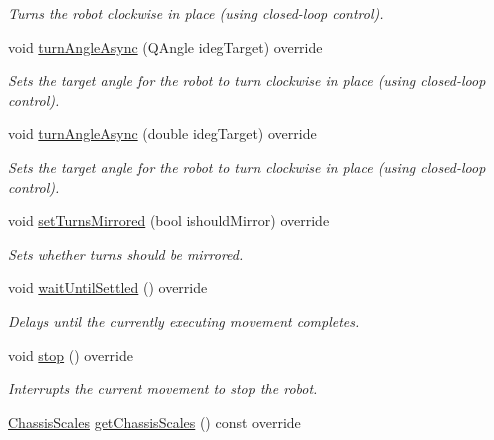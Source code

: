 \begin{DoxyCompactItemize}
\begin{DoxyCompactList}\small\item\em Turns the robot clockwise in place (using closed-\/loop control). \end{DoxyCompactList}\item 
void \mbox{\hyperlink{classokapi_1_1MockChassisController_a1811d7daa6219c274bf57a2c58d96204}{turn\+Angle\+Async}} (Q\+Angle ideg\+Target) override
\begin{DoxyCompactList}\small\item\em Sets the target angle for the robot to turn clockwise in place (using closed-\/loop control). \end{DoxyCompactList}\item 
void \mbox{\hyperlink{classokapi_1_1MockChassisController_a958241d32139ee7b709954e8d3d6cde1}{turn\+Angle\+Async}} (double ideg\+Target) override
\begin{DoxyCompactList}\small\item\em Sets the target angle for the robot to turn clockwise in place (using closed-\/loop control). \end{DoxyCompactList}\item 
void \mbox{\hyperlink{classokapi_1_1MockChassisController_a3781df1ee6cd8fc94c2a3c8bc19986a0}{set\+Turns\+Mirrored}} (bool ishould\+Mirror) override
\begin{DoxyCompactList}\small\item\em Sets whether turns should be mirrored. \end{DoxyCompactList}\item 
void \mbox{\hyperlink{classokapi_1_1MockChassisController_ae38ebe4f56aa14126103c9480214bfe7}{wait\+Until\+Settled}} () override
\begin{DoxyCompactList}\small\item\em Delays until the currently executing movement completes. \end{DoxyCompactList}\item 
void \mbox{\hyperlink{classokapi_1_1MockChassisController_ad447a57c58345fa98a1ee0504f71a8fe}{stop}} () override
\begin{DoxyCompactList}\small\item\em Interrupts the current movement to stop the robot. \end{DoxyCompactList}\item 
\mbox{\hyperlink{classokapi_1_1ChassisScales}{Chassis\+Scales}} \mbox{\hyperlink{classokapi_1_1MockChassisController_af5ce0b173f42ae48fb70f39eb986e781}{get\+Chassis\+Scales}} () const override

\end{DoxyCompactItemize}
